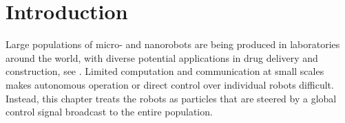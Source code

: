 \section{Introduction}\label{sec:Intro}


Large populations of micro- and nanorobots are being produced in laboratories around the world, with diverse potential applications in drug delivery and construction, see \cite{Peyer2013,Shirai2005,Chiang2011}. %
Limited computation and communication at small scales makes autonomous operation or direct control over individual robots difficult. 
Instead, this chapter treats the robots as particles that are steered by a global control signal broadcast to the entire population.    
